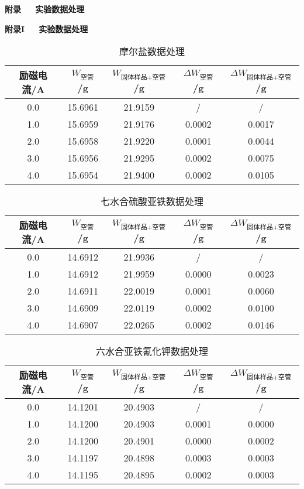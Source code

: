 \documentclass[12pt]{ctexart}
\numberwithin{equation}{section}
\begin{document}
\newpage

\begin{center}
    \LARGE\bfseries{附录~~~实验数据处理}
\end{center}
\begin{center}
    \Large\bfseries{附录I~~~实验数据处理}
\end{center}

\begin{longtable}{ccccc}
    \caption{摩尔盐数据处理} \\
    \hline
    励磁电流/A & $W_\text{空管}$/g &
    $W_\text{固体样品+空管}$/g & $\Delta W_\text{空管}$/g &
    $\Delta W_\text{固体样品+空管}$/g \\
    \hline
    0.0 & 15.6961 & 21.9159 &   /    &   /    \\
    1.0 & 15.6959 & 21.9176 & 0.0002 & 0.0017 \\
    2.0 & 15.6958 & 21.9220 & 0.0001 & 0.0044 \\
    3.0 & 15.6956 & 21.9295 & 0.0002 & 0.0075 \\
    4.0 & 15.6954 & 21.9400 & 0.0002 & 0.0105 \\
    \hline
\end{longtable}

\begin{longtable}{ccccc}
    \caption{七水合硫酸亚铁数据处理} \\
    \hline
    励磁电流/A & $W_\text{空管}$/g &
    $W_\text{固体样品+空管}$/g & $\Delta W_\text{空管}$/g &
    $\Delta W_\text{固体样品+空管}$/g \\
    \hline
    0.0 & 14.6912 & 21.9936 &   /    &   /    \\
    1.0 & 14.6912 & 21.9959 & 0.0000 & 0.0023 \\
    2.0 & 14.6911 & 22.0019 & 0.0001 & 0.0060 \\
    3.0 & 14.6909 & 22.0119 & 0.0002 & 0.0100 \\
    4.0 & 14.6907 & 22.0265 & 0.0002 & 0.0146 \\
    \hline
\end{longtable}

\begin{longtable}{ccccc}
    \caption{六水合亚铁氰化钾数据处理} \\
    \hline
    励磁电流/A & $W_\text{空管}$/g &
    $W_\text{固体样品+空管}$/g & $\Delta W_\text{空管}$/g &
    $\Delta W_\text{固体样品+空管}$/g \\
    \hline
    0.0 & 14.1201 & 20.4903 &   /    &   /    \\
    1.0 & 14.1200 & 20.4903 & 0.0001 & 0.0000 \\
    2.0 & 14.1200 & 20.4901 & 0.0000 & 0.0002 \\
    3.0 & 14.1197 & 20.4898 & 0.0003 & 0.0003 \\
    4.0 & 14.1195 & 20.4895 & 0.0002 & 0.0003 \\
    \hline
\end{longtable}
\end{document}
